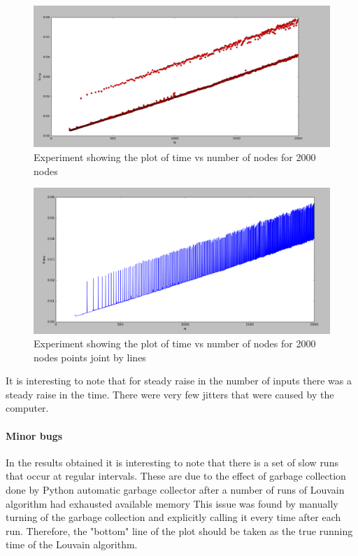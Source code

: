 \begin{figure}[H]
\centering
\includegraphics[scale=0.3]{e2000.png}
\caption{\label{ex3}Experiment showing the plot of time vs number of nodes for 2000 nodes}
\end{figure}

\begin{figure}[H]
\centering
\includegraphics[scale=0.3]{e2000b.png}
\caption{\label{ex4}Experiment showing the plot of time vs number of nodes for 2000 nodes points joint by lines}
\end{figure}

\par It  is interesting to note that for steady raise in the number of inputs there was a steady raise in the time. There were very few jitters that were caused by the computer.

\paragraph{Minor bugs}
In the results obtained it is interesting to note that there is a set of slow runs that occur at regular intervals. These are due to the effect of garbage collection done by Python automatic garbage collector after a number of runs of Louvain algorithm had exhausted available memory This issue was found by manually turning of the garbage collection and explicitly calling it every time after each run. Therefore, the "bottom" line of the plot should be taken as the true running time of the Louvain algorithm. 

